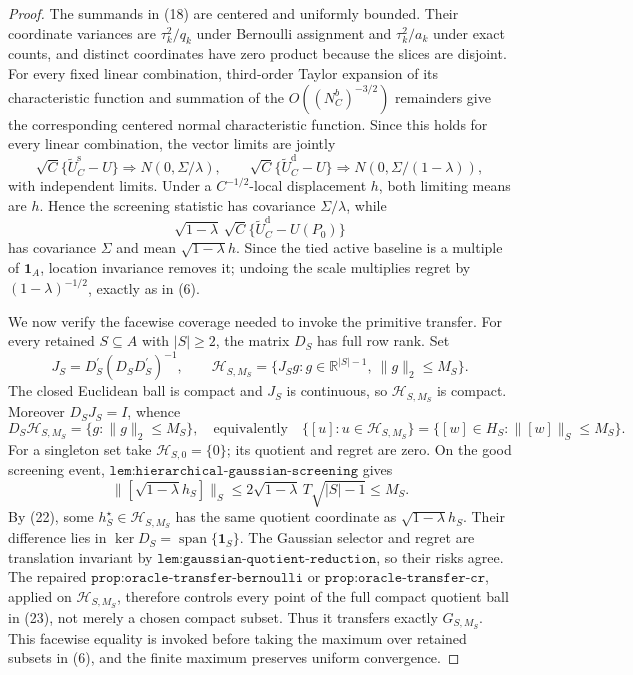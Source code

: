 \documentclass{article}
\begin{document}
\begin{proof}
The summands in (18) are centered and uniformly bounded.  Their coordinate variances are \(\tau_k^2/q_k\) under Bernoulli assignment and \(\tau_k^2/a_k\) under exact counts, and distinct coordinates have zero product because the slices are disjoint.  For every fixed linear combination, third-order Taylor expansion of its characteristic function and summation of the \(O((N_C^b)^{-3/2})\) remainders give the corresponding centered normal characteristic function.  Since this holds for every linear combination, the vector limits are jointly
\[
\sqrt C\{\widetilde U_C^{\mathrm s}-U\}
\Rightarrow N(0,\Sigma/\lambda),
\qquad
\sqrt C\{\widetilde U_C^{\mathrm d}-U\}
\Rightarrow N(0,\Sigma/(1-\lambda)),                             \tag{19}
\]
with independent limits.  Under a \(C^{-1/2}\)-local displacement \(h\), both limiting means are \(h\).  Hence the screening statistic has covariance \(\Sigma/\lambda\), while
\[
\sqrt{1-\lambda}\,\sqrt C
\{\widetilde U_C^{\mathrm d}-U(P_0)\}                             \tag{20}
\]
has covariance \(\Sigma\) and mean \(\sqrt{1-\lambda}h\).  Since the tied active baseline is a multiple of \(\mathbf1_A\), location invariance removes it; undoing the scale multiplies regret by \((1-\lambda)^{-1/2}\), exactly as in (6).

We now verify the facewise coverage needed to invoke the primitive transfer.  For every retained \(S\subseteq A\) with \(|S|\geq2\), the matrix \(D_S\) has full row rank.  Set
\[
J_S=D_S^{\prime}(D_SD_S^{\prime})^{-1},
\qquad
\mathscr H_{S,M_S}=\{J_Sg:g\in\mathbb R^{|S|-1},\ \lVert g\rVert_2\leq M_S\}.             \tag{21}
\]
The closed Euclidean ball is compact and \(J_S\) is continuous, so \(\mathscr H_{S,M_S}\) is compact.  Moreover \(D_SJ_S=I\), whence
\[
D_S\mathscr H_{S,M_S}=\{g:\lVert g\rVert_2\leq M_S\},
\quad\text{equivalently}\quad
\{[u]:u\in\mathscr H_{S,M_S}\}
=\{[w]\in H_S:\lVert[w]\rVert_S\leq M_S\}.                     \tag{22}
\]
For a singleton set take \(\mathscr H_{S,0}=\{0\}\); its quotient and regret are zero.  On the good screening event, \(\texttt{lem:hierarchical-gaussian-screening}\) gives
\[
\lVert[\sqrt{1-\lambda}h_S]\rVert_S
\leq2\sqrt{1-\lambda}\,T\sqrt{|S|-1}\leq M_S.                  \tag{23}
\]
By (22), some \(h_S^\star\in\mathscr H_{S,M_S}\) has the same quotient coordinate as \(\sqrt{1-\lambda}h_S\).  Their difference lies in \(\ker D_S=\operatorname{span}\{\mathbf1_S\}\).  The Gaussian selector and regret are translation invariant by \(\texttt{lem:gaussian-quotient-reduction}\), so their risks agree.  The repaired \(\texttt{prop:oracle-transfer-bernoulli}\) or \(\texttt{prop:oracle-transfer-cr}\), applied on \(\mathscr H_{S,M_S}\), therefore controls every point of the full compact quotient ball in (23), not merely a chosen compact subset.  Thus it transfers exactly \(G_{S,M_S}\).  This facewise equality is invoked before taking the maximum over retained subsets in (6), and the finite maximum preserves uniform convergence.


\end{proof}
\end{document}
